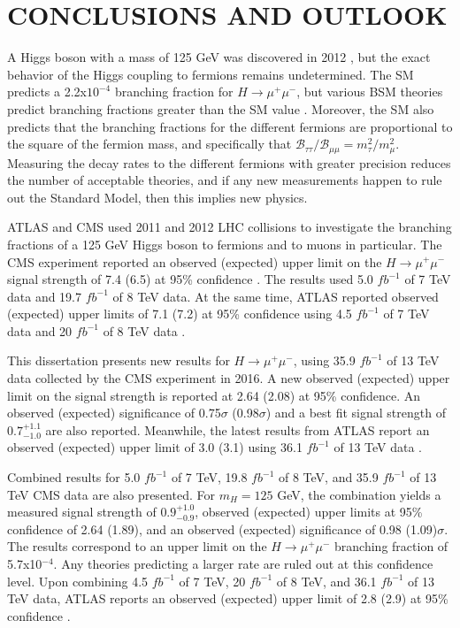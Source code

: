 \chapter{CONCLUSIONS AND OUTLOOK} \label{conclusions}

A Higgs boson with a mass of 125 GeV was discovered in 2012 \cite{atlasdiscovery,cmsdiscovery2012,cmsdiscovery2013}, but the exact behavior of the Higgs coupling to fermions remains undetermined. The SM predicts a 2.2x$10^{-4}$ branching fraction for $H\rightarrow\mu^+\mu^-$, but various BSM theories predict branching fractions greater than the SM value \cite{gtsm1, gtsm2, gtsm3}. Moreover, the SM also predicts that the branching fractions for the different fermions are proportional to the square of the fermion mass, and specifically that $\mathcal{B}_{\tau\tau}/\mathcal{B}_{\mu\mu} = m^2_\tau/m^2_\mu$. Measuring the decay rates to the different fermions with greater precision reduces the number of acceptable theories, and if any new measurements happen to rule out the Standard Model, then this implies new physics.  

ATLAS and CMS used 2011 and 2012 LHC collisions to investigate the branching fractions of a 125 GeV Higgs boson to fermions and to muons in particular. The CMS experiment reported an observed (expected) upper limit on the $H\rightarrow\mu^+\mu^-$ signal strength of 7.4 (6.5) at 95\% confidence \cite{cmshmumu2012}. The results used 5.0 $fb^{-1}$ of 7 TeV data and 19.7 $fb^{-1}$ of 8 TeV data. At the same time, ATLAS reported observed (expected) upper limits of 7.1 (7.2) at 95\% confidence using 4.5 $fb^{-1}$ of 7 TeV data and 20 $fb^{-1}$ of 8 TeV data \cite{atlashmumu2012}. 

This dissertation presents new results for $H\rightarrow\mu^+\mu^-$, using 35.9 $fb^{-1}$ of 13 TeV data collected by the CMS experiment in 2016. A new observed (expected) upper limit on the signal strength is reported at 2.64 (2.08) at 95\% confidence. An observed (expected) significance of 0.75$\sigma$ (0.98$\sigma$)  and a best fit signal strength of $0.7^{+1.1}_{-1.0}$ are also reported. Meanwhile, the latest results from ATLAS report an observed (expected) upper limit of 3.0 (3.1) using 36.1 $fb^{-1}$ of 13 TeV data \cite{atlashmumu2017}. 

Combined results for 5.0 $fb^{-1}$ of 7 TeV, 19.8 $fb^{-1}$ of 8 TeV, and 35.9 $fb^{-1}$ of 13 TeV CMS data are also presented. For $m_H=125$ GeV, the combination yields a measured signal strength of $0.9^{+1.0}_{-0.9}$, observed (expected) upper limits at 95\% confidence of 2.64 (1.89), and an observed (expected) significance of 0.98 (1.09)$\sigma$. The results correspond to an upper limit on the $H\rightarrow\mu^+\mu^-$ branching fraction of 5.7x10$^{-4}$. Any theories predicting a larger rate are ruled out at this confidence level. Upon combining 4.5 $fb^{-1}$ of 7 TeV, 20 $fb^{-1}$ of 8 TeV, and 36.1 $fb^{-1}$ of 13 TeV data, ATLAS reports an observed (expected) upper limit of 2.8 (2.9) at 95\% confidence \cite{atlashmumu2017}.

